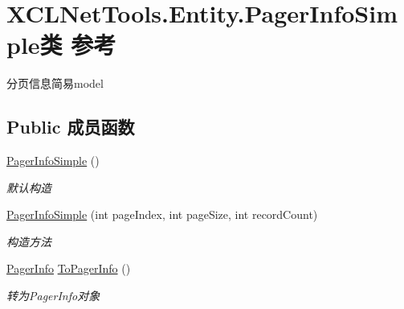 \hypertarget{class_x_c_l_net_tools_1_1_entity_1_1_pager_info_simple}{}\section{X\+C\+L\+Net\+Tools.\+Entity.\+Pager\+Info\+Simple类 参考}
\label{class_x_c_l_net_tools_1_1_entity_1_1_pager_info_simple}


分页信息简易model  


\subsection*{Public 成员函数}
\begin{DoxyCompactItemize}
\item 
\hyperlink{class_x_c_l_net_tools_1_1_entity_1_1_pager_info_simple_ad1b150dae6e6ca09d37f0335b9833896}{Pager\+Info\+Simple} ()
\begin{DoxyCompactList}\small\item\em 默认构造 \end{DoxyCompactList}\item 
\hyperlink{class_x_c_l_net_tools_1_1_entity_1_1_pager_info_simple_a76816b7397dbc6df68e1395b28d36f54}{Pager\+Info\+Simple} (int page\+Index, int page\+Size, int record\+Count)
\begin{DoxyCompactList}\small\item\em 构造方法 \end{DoxyCompactList}\item 
\hyperlink{class_x_c_l_net_tools_1_1_entity_1_1_pager_info}{Pager\+Info} \hyperlink{class_x_c_l_net_tools_1_1_entity_1_1_pager_info_simple_aad6bb233e108b30aa4204391dc2393d2}{To\+Pager\+Info} ()
\begin{DoxyCompactList}\small\item\em 转为\+Pager\+Info对象 \end{DoxyCompactList}\end{DoxyCompactItemize}
